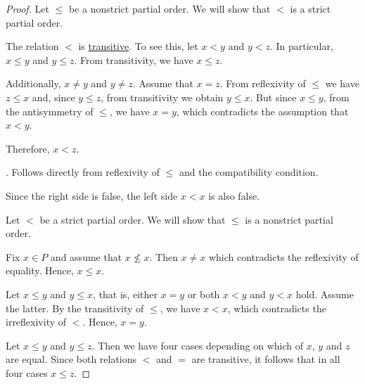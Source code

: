 \begin{proof}
   Let \( \leq \) be a nonstrict partial order. We will show that \( < \) is a strict partial order.

   The relation \( < \) is \hyperref[def:binary_relation/transitive]{transitive}. To see this, let \( x < y \) and \( y < z \). In particular, \( x \leq y \) and \( y \leq z \). From transitivity, we have \( x \leq z \).

  Additionally, \( x \neq y \) and \( y \neq z \). Assume that \( x = z \). From reflexivity of \( \leq \) we have \( z \leq x \) and, since \( y \leq z \), from transitivity we obtain \( y \leq x \). But since \( x \leq y \), from the antisymmetry of \( \leq \), we have \( x = y \), which contradicts the assumption that \( x < y \).

  Therefore, \( x < z \).

  . Follows directly from reflexivity of \( \leq \) and the compatibility condition.

  Since the right side is false, the left side \( x < x \) is also false.

   Let \( < \) be a strict partial order. We will show that \( \leq \) is a nonstrict partial order.

   Fix \( x \in P \) and assume that \( x \not\leq x \). Then \( x \neq x \) which contradicts the reflexivity of equality. Hence, \( x \leq x \).

   Let \( x \leq y \) and \( y \leq x \), that is, either \( x = y \) or both \( x < y \) and \( y < x \) hold. Assume the latter. By the transitivity of \( \leq \), we have \( x < x \), which contradicts the irreflexivity of \( < \). Hence, \( x = y \).

   Let \( x \leq y \) and \( y \leq z \). Then we have four cases depending on which of \( x \), \( y \) and \( z \) are equal. Since both relations \( < \) and \( = \) are transitive, it follows that in all four cases \( x \leq z \).
\end{proof}

